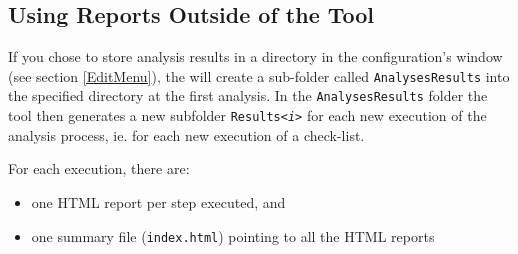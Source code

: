 % 

\subsection{Using Reports Outside of the Tool} \label{HTMLReportGeneration}

If you chose to store analysis results in a directory in the configuration's
window (see section \ref{EditMenu}), the \ma will create
a sub-folder called \texttt{AnalysesResults} into the specified directory at the
first analysis. In the \texttt{AnalysesResults} folder the tool then generates a
new subfolder \texttt{Results\emph{<i>}} for each new execution of the analysis
process, ie. for each new execution of a check-list.
 
For each execution, there are: 
\begin{itemize}
\item one HTML report per step executed, and
\item one summary file (\texttt{index.html}) pointing to all the HTML reports
\end{itemize}


